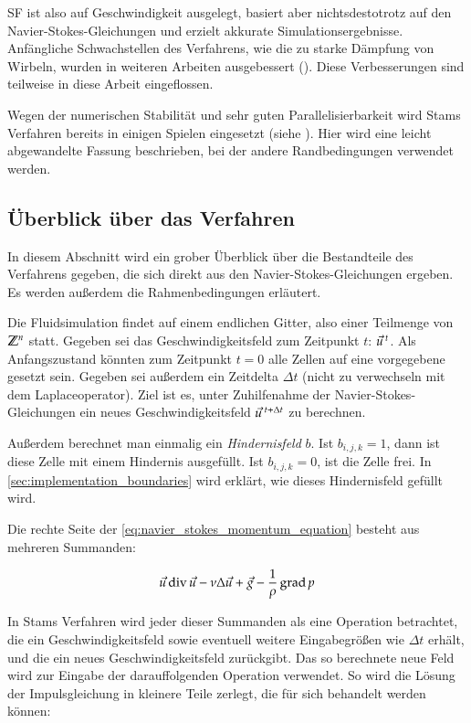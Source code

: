 SF ist also auf Geschwindigkeit ausgelegt, basiert aber
nichtsdestotrotz auf den Navier-Stokes-Gleichungen und erzielt
akkurate Simulationsergebnisse. Anfängliche Schwachstellen des
Verfahrens, wie die zu starke Dämpfung von Wirbeln, wurden in weiteren
Arbeiten ausgebessert (\cite{Foster}). Diese Verbesserungen sind
teilweise in diese Arbeit eingeflossen.

Wegen der numerischen Stabilität und sehr guten Parallelisierbarkeit
wird Stams Verfahren bereits in einigen Spielen eingesetzt (siehe
\cite{Crane2007, Peschel2009}). Hier wird eine leicht abgewandelte
Fassung beschrieben, bei der andere Randbedingungen verwendet werden.

\subsection{Überblick über das Verfahren}

In diesem Abschnitt wird ein grober Überblick über die Bestandteile
des Verfahrens gegeben, die sich direkt aus den
Navier-Stokes-Gleichungen ergeben. Es werden außerdem die
Rahmenbedingungen erläutert.

Die Fluidsimulation findet auf einem endlichen Gitter, also einer
Teilmenge von $\mathbb{Z}^n$ statt. Gegeben sei das
Geschwindigkeitsfeld zum Zeitpunkt $t$:
$\vec{u}^{\textnormal{ }t}$. Als Anfangszustand
könnten zum Zeitpunkt $t=0$ \PimiddyzB{} alle Zellen auf eine vorgegebene
 gesetzt sein.  Gegeben sei außerdem ein
Zeitdelta $\Delta t$ (nicht zu verwechseln mit dem
Laplaceoperator). Ziel ist es, unter Zuhilfenahme der
Navier-Stokes-Gleichungen ein neues Geschwindigkeitsfeld
$\vec{u}^{\textnormal{ }t+\Delta t}$ zu berechnen.

Außerdem berechnet man einmalig ein \emph{Hindernisfeld}
$b$. Ist $b_{i,j,k} = 1$, dann ist diese Zelle mit einem
Hindernis ausgefüllt. Ist $b_{i,j,k} = 0$, ist die Zelle frei. In
\cref{sec:implementation_boundaries} wird erklärt, wie dieses
Hindernisfeld gefüllt wird.

Die rechte Seite der \cref{eq:navier_stokes_momentum_equation} besteht
aus mehreren Summanden:

\begin{equation}
\vec{u} \operatorname*{div} \vec{u} -
\nu \Delta \vec{u} +
\vec{g} -
\frac{
	1
}
{
	\rho
}
\operatorname*{grad} p
\end{equation}

In Stams Verfahren wird jeder dieser Summanden als eine Operation betrachtet,
die ein Geschwindigkeitsfeld sowie eventuell weitere Eingabegrößen wie $\Delta
t$ erhält, und die ein neues Geschwindigkeitsfeld zurückgibt. Das so berechnete
neue Feld wird zur Eingabe der darauffolgenden Operation verwendet. So
wird die Lösung der Impulsgleichung in kleinere Teile zerlegt, die für
sich behandelt werden können:

